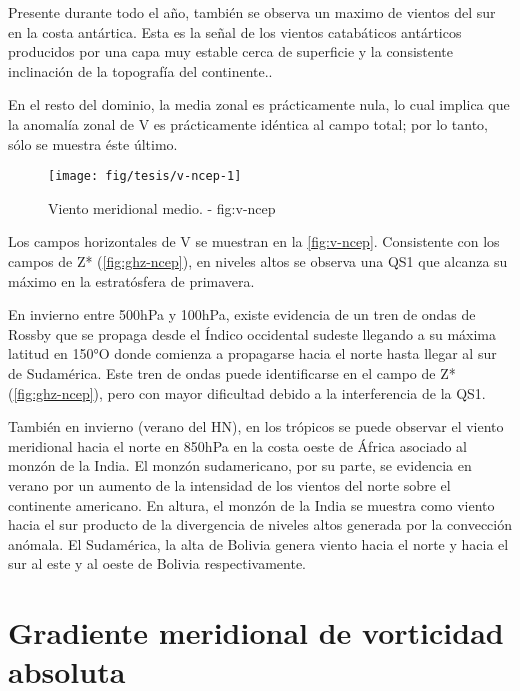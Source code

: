 \documentclass[spanish,a4paper]{book}
\begin{document}
Presente durante todo el año, también se observa un maximo de vientos
del sur en la costa antártica. Esta es la señal de los vientos
catabáticos antárticos producidos por una capa muy estable cerca de
superficie y la consistente inclinación de la topografía del
continente..

En el resto del dominio, la media zonal es prácticamente nula, lo cual
implica que la anomalía zonal de V es prácticamente idéntica al campo
total; por lo tanto, sólo se muestra éste último.

\begin{landscape}\begin{figure}

{\centering \texttt{[image: fig/tesis/v-ncep-1]} 

}

\caption{Viento meridional medio. - fig:v-ncep}\label{fig:v-ncep}
\end{figure}
\end{landscape}

Los campos horizontales de V se muestran en la \autoref{fig:v-ncep}.
Consistente con los campos de Z* (\autoref{fig:ghz-ncep}), en niveles
altos se observa una QS1 que alcanza su máximo en la estratósfera de
primavera.

En invierno entre 500hPa y 100hPa, existe evidencia de un tren de ondas
de Rossby que se propaga desde el Índico occidental sudeste llegando a
su máxima latitud en 150°O donde comienza a propagarse hacia el norte
hasta llegar al sur de Sudamérica. Este tren de ondas puede
identificarse en el campo de Z* (\autoref{fig:ghz-ncep}), pero con mayor
dificultad debido a la interferencia de la QS1.

También en invierno (verano del HN), en los trópicos se puede observar
el viento meridional hacia el norte en 850hPa en la costa oeste de
África asociado al monzón de la India. El monzón sudamericano, por su
parte, se evidencia en verano por un aumento de la intensidad de los
vientos del norte sobre el continente americano. En altura, el monzón de
la India se muestra como viento hacia el sur producto de la divergencia
de niveles altos generada por la convección anómala. El Sudamérica, la
alta de Bolivia genera viento hacia el norte y hacia el sur al este y al
oeste de Bolivia respectivamente.

\begin{landscape}\end{landscape}

\section{Gradiente meridional de vorticidad
absoluta}\label{gradiente-meridional-de-vorticidad-absoluta}
\end{document}
